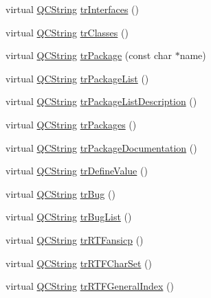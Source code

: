\begin{DoxyCompactItemize}
\item 
virtual \mbox{\hyperlink{class_q_c_string}{Q\+C\+String}} \mbox{\hyperlink{class_translator_norwegian_af6584d5199bcba69b0ae9d2000456159}{tr\+Interfaces}} ()
\item 
virtual \mbox{\hyperlink{class_q_c_string}{Q\+C\+String}} \mbox{\hyperlink{class_translator_norwegian_a6f5a448e25b026e9857c36c849d56451}{tr\+Classes}} ()
\item 
virtual \mbox{\hyperlink{class_q_c_string}{Q\+C\+String}} \mbox{\hyperlink{class_translator_norwegian_ac9c006ac458ddf2eaf91581ff71c4e38}{tr\+Package}} (const char $\ast$name)
\item 
virtual \mbox{\hyperlink{class_q_c_string}{Q\+C\+String}} \mbox{\hyperlink{class_translator_norwegian_a7bc92ccd5f87e67b3814041d1cea7494}{tr\+Package\+List}} ()
\item 
virtual \mbox{\hyperlink{class_q_c_string}{Q\+C\+String}} \mbox{\hyperlink{class_translator_norwegian_ae0077f95662dc4f9004d007905881e7a}{tr\+Package\+List\+Description}} ()
\item 
virtual \mbox{\hyperlink{class_q_c_string}{Q\+C\+String}} \mbox{\hyperlink{class_translator_norwegian_a274998ad1b62c49a131f7bd7a3d64e36}{tr\+Packages}} ()
\item 
virtual \mbox{\hyperlink{class_q_c_string}{Q\+C\+String}} \mbox{\hyperlink{class_translator_norwegian_a15329bbb12d3758100a967929612ed09}{tr\+Package\+Documentation}} ()
\item 
virtual \mbox{\hyperlink{class_q_c_string}{Q\+C\+String}} \mbox{\hyperlink{class_translator_norwegian_abbba5c7fcdb5c95a4f58ad017606e738}{tr\+Define\+Value}} ()
\item 
virtual \mbox{\hyperlink{class_q_c_string}{Q\+C\+String}} \mbox{\hyperlink{class_translator_norwegian_aef08a3603e15397c3ba2d1f2c1acb446}{tr\+Bug}} ()
\item 
virtual \mbox{\hyperlink{class_q_c_string}{Q\+C\+String}} \mbox{\hyperlink{class_translator_norwegian_a9d04b3b040287b449284f228ba50dd92}{tr\+Bug\+List}} ()
\item 
virtual \mbox{\hyperlink{class_q_c_string}{Q\+C\+String}} \mbox{\hyperlink{class_translator_norwegian_a53fc2ec893e9135938981db15869f645}{tr\+R\+T\+Fansicp}} ()
\item 
virtual \mbox{\hyperlink{class_q_c_string}{Q\+C\+String}} \mbox{\hyperlink{class_translator_norwegian_a016327548c204763cf56e4fea6e4ad77}{tr\+R\+T\+F\+Char\+Set}} ()
\item 
virtual \mbox{\hyperlink{class_q_c_string}{Q\+C\+String}} \mbox{\hyperlink{class_translator_norwegian_a763dc30e34241a86cb4c9d491c7ec5e6}{tr\+R\+T\+F\+General\+Index}} ()

\end{DoxyCompactItemize}
